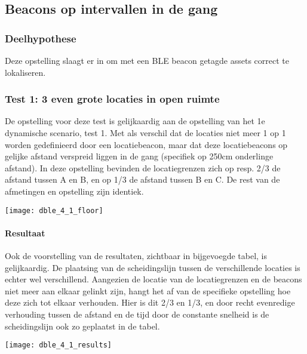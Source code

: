 \subsection{Beacons op intervallen in de gang}
\subsubsection{Deelhypothese}
Deze opstelling slaagt er in om met een BLE beacon getagde assets correct te lokaliseren.

\subsubsection{Test 1: 3 even grote locaties in open ruimte}
\begin{minipage}{0.55\textwidth}
De opstelling voor deze test is gelijkaardig aan de opstelling van het 1e dynamische scenario, test 1. Met als verschil dat de locaties niet meer 1 op 1 worden gedefinieerd door een locatiebeacon, maar dat deze locatiebeacons op gelijke afstand verspreid liggen in de gang (specifiek op 250cm onderlinge afstand). In deze opstelling bevinden de locatiegrenzen zich op resp. 2/3 de afstand tussen A en B, en op 1/3 de afstand tussen B en C. De rest van de afmetingen en opstelling zijn identiek.
\end{minipage}
\hfill
\begin{minipage}{0.42\textwidth}
	\texttt{[image: dble\_4\_1\_floor]}
\end{minipage}

\paragraph{Resultaat}
\begin{minipage}{0.42\textwidth}
Ook de voorstelling van de resultaten, zichtbaar in bijgevoegde tabel, is gelijkaardig. De plaatsing van de scheidingslijn tussen de verschillende locaties is echter wel verschillend. Aangezien de locatie van de locatiegrenzen en de beacons niet meer aan elkaar gelinkt zijn, hangt het af van de specifieke opstelling hoe deze zich tot elkaar verhouden. Hier is dit 2/3 en 1/3, en door recht evenredige verhouding tussen de afstand en de tijd door de constante snelheid is de scheidingslijn ook zo geplaatst in de tabel.
\end{minipage}
\hfill
\begin{minipage}{0.55\textwidth}
	\texttt{[image: dble\_4\_1\_results]}
\end{minipage}

